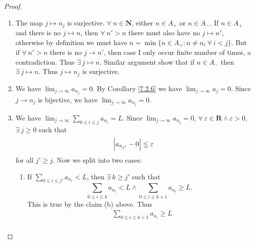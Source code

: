 \begin{proof}
\begin{enumerate}
              Since \(\sum_{i > j} a_{n_i}\) is decreasing and has lower bound, by Additional Corollary \ref{ac 6.3.1} \(\sum_{i > j} a_{n_i}\) is convergent.
              But this means \(\sum_{n \in A_-} a_n\) is absolutely convergent (which proof can be found above), a contradiction.
              Thus case I occurs infinite number of times.
              Similar proof show that case II also occurs infinite number of times.
        \item The map \(j \mapsto n_j\) is surjective.
              \(\forall\ n \in \mathbf{N}\), either \(n \in A_+\) or \(n \in A_-\).
              If \(n \in A_+\) and there is no \(j \mapsto n\), then \(\forall\ n' > n\) there must also have no \(j \mapsto n'\), otherwise by definition we must have \(n = \min\{n \in A_+ : n \neq n_i \ \forall\ i < j\}\).
              But if \(\forall\ n' > n\) there is no \(j \to n'\), then case I only occur finite number of times, a contradiction.
              Thus \(\exists\ j \mapsto n\).
              Similar argument show that if \(n \in A_-\) then \(\exists\ j \mapsto n\).
              Thus \(j \mapsto n_j\) is surjective.
        \item We have \(\lim_{j \to \infty} a_{n_j} = 0\).
              By Corollary \ref{7.2.6} we have \(\lim_{j \to \infty} a_j = 0\).
              Since \(j \to n_j\) is bijective, we have \(\lim_{j \to \infty} a_{n_j} = 0\).
        \item We have \(\lim_{j \to \infty} \sum_{0 \leq i \leq j} a_{n_i} = L\).
              Since \(\lim_{j \to \infty} a_{n_j} = 0\), \(\forall\ \varepsilon \in \mathbf{R} \land \varepsilon > 0\), \(\exists\ j \geq 0\) such that
              \[
                  \abs*{a_{n_{j'}} - 0} \leq \varepsilon
              \]
              for all \(j' \geq j\).
              Now we split into two cases:
              \begin{enumerate}[label=(\Roman*)]
                  \item If \(\sum_{0 \leq i \leq j'} a_{n_i} < L\), then \(\exists\ k \geq j'\) such that
                        \[
                            \sum_{0 \leq i \leq k} a_{n_i} < L \land \sum_{0 \leq i \leq k + 1} a_{n_i} \geq L.
                        \]
                        This is true by the claim (b) above.
                        Thus
                        \begin{align*}
                                     & \sum_{0 \leq i \leq k + 1} a_{n_i} \geq L                                                                       \\

\end{align*}
\end{enumerate}
\end{enumerate}
\end{proof}
